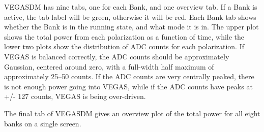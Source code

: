 VEGASDM has nine tabs, one for each Bank, and one overview tab. If a Bank is
active, the tab label will be green, otherwise it will be red. Each Bank tab
shows whether the Bank is in the running state, and what mode it is in. The
upper plot shows the total power from each polarization as a function of
time, while the lower two plots show the distribution of \gls{ADC} counts for
each polarization. If \gls{VEGAS} is balanced correctly, the \gls{ADC} counts should
be approximately Gaussian, centered around zero, with a full-width half
maximum of approximately 25--50 counts. If the \gls{ADC} counts are very centrally
peaked, there is not enough power going into \gls{VEGAS}, while if the \gls{ADC} counts
have peaks at +/- 127 counts, \gls{VEGAS} is being over-driven.

The final tab of VEGASDM gives an overview plot of the total power for all
eight banks on a single screen.





